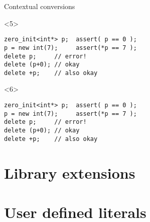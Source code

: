 \documentclass[10pt]{beamer}
\begin{document}
\begin{frame}[fragile]{Contextual conversions}
	\begin{onlyenv}
	\begin{verbatim}
zero_init<int*> p;  assert( p == 0 );
p = new int(7);     assert(*p == 7 );
delete p;     // error!
delete (p+0); // okay
delete +p;    // also okay
	\end{verbatim}
	\end{onlyenv}

	\begin{onlyenv}
	\begin{verbatim}
zero_init<int*> p;  assert( p == 0 );
p = new int(7);     assert(*p == 7 );
delete p;     // error!
delete (p+0); // okay
delete +p;    // also okay
	\end{verbatim}
	\end{onlyenv}
\end{frame}

\section{Library extensions}
\section{User defined literals}
\end{document}
